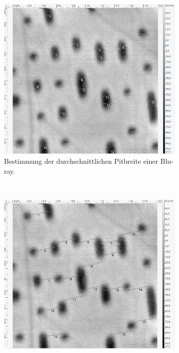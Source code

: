 \begin{figure}[H]
\centering
	\begin{subfigure}[t]{0.4\textwidth}
	\includegraphics[width=\textwidth]{AFM_auswertung/bluray_breite.png}
	\caption{Bestimmung der durchschnittlichen Pitbreite einer Blu-ray.}
	\end{subfigure}
	~
	\begin{subfigure}[t]{0.4\textwidth}
	\includegraphics[width=\textwidth]{AFM_auswertung/bluray_abstand.png}

\end{subfigure}
\end{figure}
